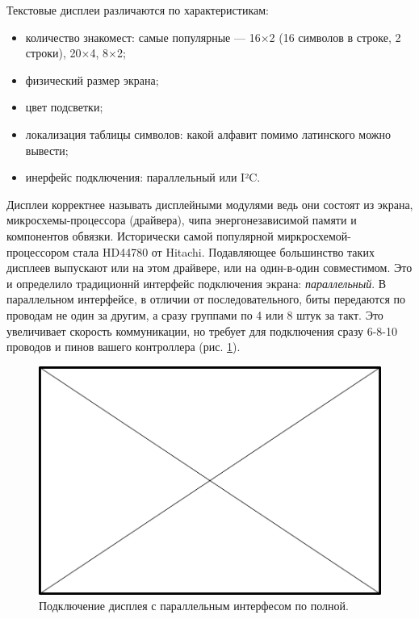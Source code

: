 Текстовые дисплеи различаются по характеристикам:

\begin{itemize}
  \item количество знакомест: самые популярные — 16×2 (16 символов в строке, 2 строки), 20×4, 8×2;
  \item физический размер экрана;
  \item цвет подсветки;
  \item локализация таблицы символов: какой алфавит помимо латинского можно вывести;
  \item инерфейс подключения: параллельный или I²C.
\end{itemize}

Дисплеи корректнее называть дисплейными модулями ведь они состоят из экрана, микросхемы-процессора (драйвера), чипа энергонезависимой памяти и компонентов обвязки. Исторически самой популярной миркросхемой-процессором стала HD44780 от Hitachi. Подавляющее большинство таких дисплеев выпускают или на этом драйвере, или на один-в-один совместимом. Это и определило традиционнй интерфейс подключения экрана: \emph{параллельный}. В параллельном интерфейсе, в отличии от последовательного, биты передаются по проводам не один за другим, а сразу группами по 4 или 8 штук за такт. Это увеличивает скорость коммуникации, но требует для подключения сразу 6-8-10 проводов и пинов вашего контроллера (рис. \ref{fig:text-lcd-parallel-8}).

\begin{figure}
  \centering
  \includegraphics{TODO}
  \caption{Подключение дисплея с параллельным интерфесом по полной.}
  \label{fig:text-lcd-parallel-8}
\end{figure}

